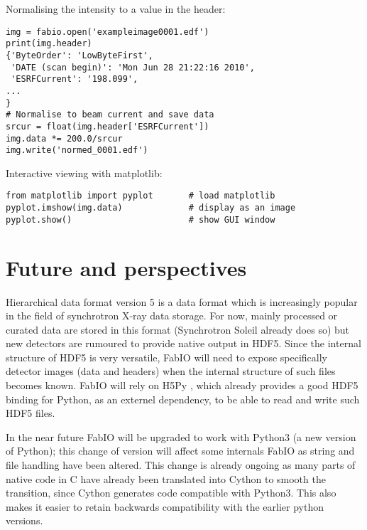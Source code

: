 \documentclass[preprint ]{iucr}
\begin{document}
Normalising the intensity to a value in the header:\\
\begin{verbatim}
img = fabio.open('exampleimage0001.edf')
print(img.header)
{'ByteOrder': 'LowByteFirst',
 'DATE (scan begin)': 'Mon Jun 28 21:22:16 2010',
 'ESRFCurrent': '198.099',
...
}
# Normalise to beam current and save data
srcur = float(img.header['ESRFCurrent'])
img.data *= 200.0/srcur
img.write('normed_0001.edf')
\end{verbatim}

Interactive viewing with matplotlib:\\
\begin{verbatim}
from matplotlib import pyplot       # load matplotlib 
pyplot.imshow(img.data)             # display as an image
pyplot.show()                       # show GUI window
\end{verbatim}


\section{Future and perspectives}

Hierarchical data format version 5 \cite{hdf5} is a data format which is
increasingly popular in the field of synchrotron X-ray data storage.
For now, mainly processed or curated data are stored in this format (Synchrotron
Soleil \cite{tub05} already does so) but new detectors are
rumoured to provide native output in HDF5.
Since the internal structure of HDF5 is very versatile, FabIO will need to expose 
specifically detector images (data and headers) when the internal structure 
of such files becomes known. FabIO will rely on H5Py \cite{h5py}, which already
provides a good HDF5 binding for Python, as an externel dependency, to be able
to read and write such HDF5 files.

In the near future FabIO will be upgraded to work with Python3 (a new version of 
Python); this change of version will affect some internals FabIO as string and 
file handling have been altered.
This change is already ongoing as many parts of native code in C have already
been translated into Cython \cite{cython} to smooth the transition, since 
Cython generates code compatible with Python3. 
This also makes it easier to retain backwards compatibility with the earlier
python versions. %
\end{document}
